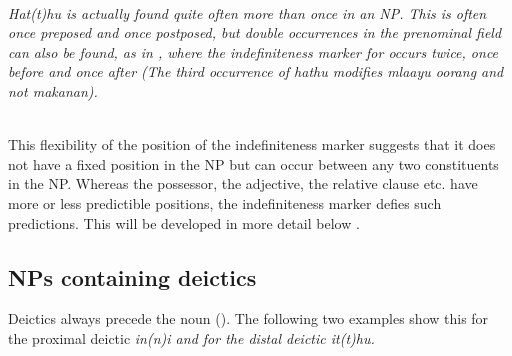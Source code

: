  \\
\em Hat(t)hu \em is actually found quite often more than once in an NP. This is often once preposed and once postposed, but double occurrences in the prenominal field can also be found, as in , where the indefiniteness marker for  occurs twice, once before and once after  (The third occurrence of \em hathu \em modifies \em mlaayu oorang \em and not \em makanan\em).

 \\
This flexibility of the position of the indefiniteness marker suggests that it does not have a fixed position in the NP but can occur between any two constituents in the NP. Whereas the possessor, the adjective, the relative clause etc. have more or less predictible positions, the indefiniteness marker defies such predictions. This will be developed in more detail below .

%
\subsection{NPs containing deictics}\label{sec:nppp:NPscontainingdeictics}
Deictics always precede the noun (\citet[29]{Adelaar1991}\citet[214]{Adelaar2005struct}\citet[137]{Slomanson2007cll}). The following two examples show this for the proximal deictic \em in(n)i \em and for the distal deictic \em it(t)hu\em.


